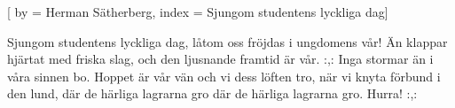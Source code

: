 

[ 
by = {Herman Sätherberg},
index = {Sjungom studentens lyckliga dag}]

\beginverse* 
Sjungom studentens lyckliga dag,
låtom oss fröjdas i ungdomens vår!
Än klappar hjärtat med friska slag,
och den ljusnande framtid är vår.
:,: Inga stormar än 
i våra sinnen bo.
Hoppet är vår vän 
och vi dess löften tro,
när vi knyta förbund i den lund,
där de härliga lagrarna gro
där de härliga lagrarna gro.
Hurra! :,: 
\endverse
\endsong
